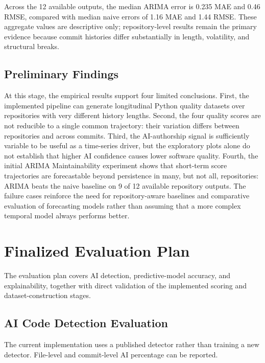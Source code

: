 \documentclass[12pt,a4paper,oneside]{report}
\begin{document}
Across the 12 available outputs, the median ARIMA error is 0.235 MAE and 0.46 RMSE, compared with median naive errors of 1.16 MAE and 1.44 RMSE. These aggregate values are descriptive only; repository-level results remain the primary evidence because commit histories differ substantially in length, volatility, and structural breaks.

\section{Preliminary Findings}
At this stage, the empirical results support four limited conclusions. First, the implemented pipeline can generate longitudinal Python quality datasets over repositories with very different history lengths. Second, the four quality scores are not reducible to a single common trajectory: their variation differs between repositories and across commits. Third, the AI-authorship signal is sufficiently variable to be useful as a time-series driver, but the exploratory plots alone do not establish that higher AI confidence causes lower software quality. Fourth, the initial ARIMA Maintainability experiment shows that short-term score trajectories are forecastable beyond persistence in many, but not all, repositories: ARIMA beats the naive baseline on 9 of 12 available repository outputs. The failure cases reinforce the need for repository-aware baselines and comparative evaluation of forecasting models rather than assuming that a more complex temporal model always performs better.

\chapter{Finalized Evaluation Plan}
\label{ch:evaluation}

The evaluation plan covers AI detection, predictive-model accuracy, and explainability, together with direct validation of the implemented scoring and dataset-construction stages.

\section{AI Code Detection Evaluation}
The current implementation uses a published detector rather than training a new detector. File-level and commit-level AI percentage can be reported. 
\end{document}
